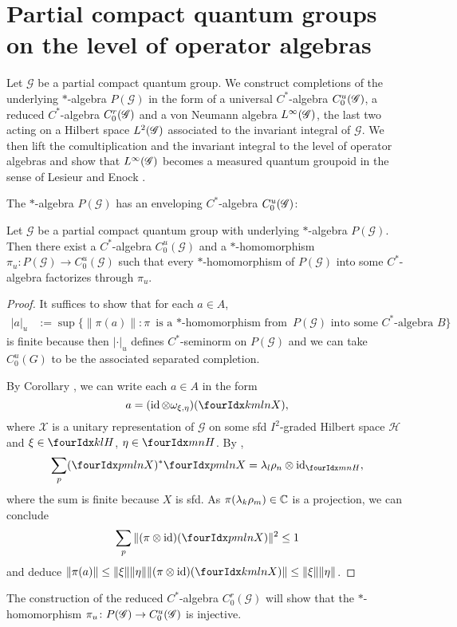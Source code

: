 \section{Partial compact quantum groups on the level of operator algebras}


Let $\mathscr{G}$ be a partial compact quantum group. We construct
completions of the underlying $*$-algebra $P(\mathscr{G})$ in the form
of a universal $C^{*}$-algebra $C^{u}_{0}(\mathscr{G})$, a reduced $C^{*}$-algebra
$C^{r}_{0}(\mathscr{G})$ and a von Neumann algebra $L^{\infty}(\mathscr{G})$, the last two acting on a
Hilbert space $L^{2}(\mathscr{G})$ associated to the invariant integral of
$\mathscr{G}$.  We then lift the comultiplication and the invariant
integral to the level of
operator algebras and show that $L^{\infty}(\mathscr{G})$ becomes a measured quantum
groupoid in the sense of Lesieur \cite{Les1} and Enock \cite{Eno2}.

The $*$-algebra $P(\mathscr{G})$ has an enveloping $C^{*}$-algebra $C^{u}_{0}(\mathscr{G})$:
\begin{Prop}
Let $\mathscr{G}$ be a partial compact quantum group with underlying
$*$-algebra $P(\mathscr{G})$. Then
  there exist a $C^{*}$-algebra $C^{u}_{0}(\mathscr{G})$ and a
  $*$-homomorphism $\pi_{u} \colon P(\mathscr{G}) \to
  C^{u}_{0}(\mathscr{G})$ such that every $*$-homomorphism of
  $P(\mathscr{G})$ into some $C^{*}$-algebra factorizes through
  $\pi_{u}$.
\end{Prop}
\begin{proof}
It suffices to show that for each $a \in A$,
\begin{align*} 
  |a|_{u}&:= \sup \{ \|\pi(a)\| : \pi \text{ is a $*$-homomorphism from } P(\mathscr{G})
  \text{ into some $C^{*}$-algebra } B\}
\end{align*}
is finite because then $|\cdot |_{u}$ defines $C^{*}$-seminorm on
$P(\mathscr{G})$ and we can take $C^{u}_{0}(G)$ to be the associated
separated completion.


By Corollary \cite[Proposition 3.31]{DCT1}, we can write each $a\in A$
in the form \[a=(\id \otimes \omega_{\xi,\eta})(\Gr{X}{k}{l}{m}{n}),\]
where $\mathscr{X}$ is a unitary representation of
$\mathscr{G}$ on some sfd $I^{2}$-graded Hilbert space
$\mathcal{H}$ and $\xi\in \Gru{H}{k}{l}$, $\eta\in
\Gru{H}{m}{n}$.  By \cite[Lemma 3.12]{DCT1},
  \begin{align*}
    \sum_{p}(\Gr{X}{p}{l}{m}{n})^{*} \Gr{X}{p}{l}{m}{n}  = \lambda_{l}\rho_{n}
    \otimes \id_{\Gru{H}{m}{n}},
  \end{align*}
where  the sum is  finite because $X$ is sfd. As
  $\pi(\lambda_{k}\rho_{m})\in \mathbb{C}$ is a projection, we can conclude
  \begin{align} \label{eq:corep-estimate}
    \sum_{p} \| (\pi \otimes \id)(\Gr{X}{p}{l}{m}{n})\|^{2} \leq 1
  \end{align}
  and deduce $\|\pi(a)\| \leq \| \xi\| \|\eta\| \|(\pi \otimes \id)(\Gr{X}{k}{l}{m}{n})\| \leq
    \|\xi\|\|\eta\| $. 
\end{proof}
The construction of the reduced $C^{*}$-algebra
$C^{r}_{0}(\mathscr{G})$ will show that the $*$-homomorphism $\pi_{u}
\colon P(\mathscr{G}) \to C^{u}_{0}(\mathscr{G})$ is injective.

